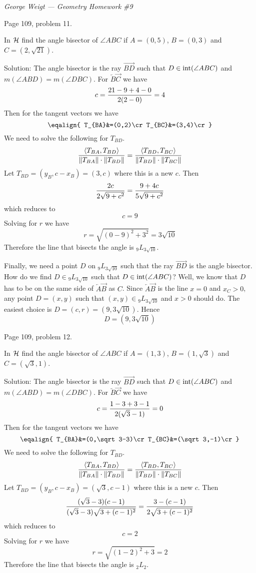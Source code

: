 
\noindent
{\it George Weigt --- Geometry Homework \#9}

\beginsection Page 109, problem 11.

In $\cal H$ find the angle bisector of $\angle ABC$ if $A=(0,5)$, $B=(0,3)$
and $C=(2,\sqrt{21})$.

\bigskip
\noindent
Solution: The angle bisector is the ray $\overrightarrow{BD}$ such that
$D\in\mathop{\rm int}(\angle ABC)$ and $m(\angle ABD)=m(\angle DBC)$.
For $\overleftarrow B\overrightarrow C$ we have
$$c={21-9+4-0\over2(2-0)}=4$$
Then for the tangent vectors we have
$$\eqalign{
T_{BA}&=(0,2)\cr
T_{BC}&=(3,4)\cr
}$$
We need to solve the following for $T_{BD}$.
$$
{\langle T_{BA},T_{BD}\rangle\over\|T_{BA}\|\cdot\|T_{BD}\|}
=
{\langle T_{BD},T_{BC}\rangle\over\|T_{BD}\|\cdot\|T_{BC}\|}
$$
Let $T_{BD}=(y_B,c-x_B)=(3,c)$ where this is a new $c$. Then
$${2c\over2\sqrt{9+c^2}}={9+4c\over5\sqrt{9+c^2}}$$
which reduces to
$$c=9$$
Solving for $r$ we have
$$r=\sqrt{(0-9)^2+3^2}=3\sqrt{10}$$
Therefore the line that bisects the angle is ${}_9L_{3\sqrt{10}}$.

\bigskip
\noindent
Finally, we need a point $D$ on ${}_9L_{3\sqrt{10}}$ such that
the ray $\overrightarrow{BD}$ is the angle bisector.
How do we find $D\in{}_9L_{3\sqrt{10}}$ such that $D\in\mathop{\rm int}(\angle ABC)$?
Well, we know that $D$ has to be on the same side of $\overleftarrow A\overrightarrow B$
as $C$.
Since $\overleftarrow A\overrightarrow B$ is the line $x=0$ and $x_C>0$,
any point $D=(x,y)$ such that $(x,y)\in{}_9L_{3\sqrt{10}}$ and $x>0$ should do.
The easiest choice is $D=(c,r)=(9,3\sqrt{10})$. Hence
$$D=(9,3\sqrt{10})$$

\vfill
\eject

\beginsection Page 109, problem 12.

In $\cal H$ find the angle bisector of $\angle ABC$ if $A=(1,3)$, $B=(1,\sqrt3)$
and $C=(\sqrt3,1)$.

\bigskip
\noindent
Solution: The angle bisector is the ray $\overrightarrow{BD}$ such that
$D\in\mathop{\rm int}(\angle ABC)$ and $m(\angle ABD)=m(\angle DBC)$.
For $\overleftarrow B\overrightarrow C$ we have
$$c={1-3+3-1\over2(\sqrt3-1)}=0$$
Then for the tangent vectors we have
$$\eqalign{
T_{BA}&=(0,\sqrt3-3)\cr
T_{BC}&=(\sqrt3,-1)\cr
}$$
We need to solve the following for $T_{BD}$.
$$
{\langle T_{BA},T_{BD}\rangle\over\|T_{BA}\|\cdot\|T_{BD}\|}
=
{\langle T_{BD},T_{BC}\rangle\over\|T_{BD}\|\cdot\|T_{BC}\|}
$$
Let $T_{BD}=(y_B,c-x_B)=(\sqrt3,c-1)$ where this is a new $c$. Then
$${(\sqrt3-3)(c-1)\over(\sqrt3-3)\sqrt{3+(c-1)^2}}={3-(c-1)\over2\sqrt{3+(c-1)^2}}$$
which reduces to
$$c=2$$
Solving for $r$ we have
$$r=\sqrt{(1-2)^2+3}=2$$
Therefore the line that bisects the angle is ${}_2L_{2}$.

